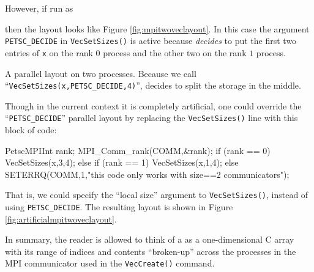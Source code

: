 However, if run as
then the layout looks like Figure \ref{fig:mpitwoveclayout}.  In this case the argument \texttt{PETSC\_DECIDE} in \texttt{VecSetSizes()} is active because \PETSc \emph{decides} to put the first two entries of \texttt{x} on the rank $0$ process and the other two on the rank $1$ process. 

\begin{marginfigure}
\bigskip
\caption{A parallel \pVec layout on two processes.  Because we call ``\texttt{VecSetSizes(x,PETSC\_DECIDE,4)}'', \PETSc decides to split the storage in the middle.}
\label{fig:mpitwoveclayout}
\end{marginfigure}

Though in the current context it is completely artificial, one could override the ``\texttt{PETSC\_DECIDE}'' parallel layout by replacing the \texttt{VecSetSizes()} line with this block of code:
\begin{code}
PetscMPIInt rank;
MPI_Comm_rank(COMM,&rank);
if (rank == 0) {
  VecSetSizes(x,3,4);
} else if (rank == 1) {
  VecSetSizes(x,1,4);
} else {
  SETERRQ(COMM,1,"this code only works with size==2 communicators");
}
\end{code}
That is, we could specify the ``local size'' argument to \texttt{VecSetSizes()}, instead of using \texttt{PETSC\_DECIDE}.  The resulting layout is shown in Figure \ref{fig:artificialmpitwoveclayout}.

In summary, the reader is allowed to think of a \PETSc \pVec as a one-dimensional C array with its range of indices and contents ``broken-up'' across the processes in the MPI communicator used in the \texttt{VecCreate()} command.

